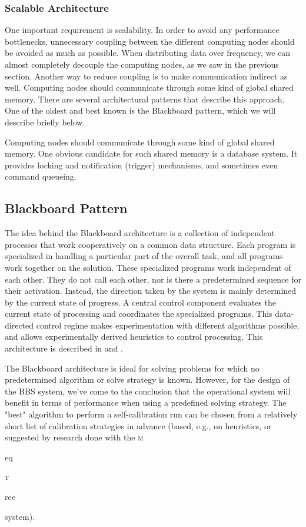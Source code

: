 \documentclass[10pt]{lofar}
\newcommand{\todo}[1]{\begin{center}\fbox{\parbox{0.9\textwidth}{\textbf{!!FIXME!! #1}}}\end{center}}
\newcommand{\meqtree}{\textsc{m}\begin{footnotesize}eq\end{footnotesize}\textsc{t}\begin{footnotesize}ree\end{footnotesize}\xspace}
\begin{document}
\subsubsection{Scalable Architecture}
\label{subsubsec:scalable-architecture}
One important requirement is scalability. In order to avoid any performance
bottlenecks, unnecessary coupling between the different computing nodes should
be avoided as much as possible. When distributing data over frequency, we can
almost completely decouple the computing nodes, as we saw in the previous
section. Another way to reduce coupling is to make communication indirect as
well. Computing nodes should communicate through some kind of global shared
memory. There are several architectural patterns that describe this approach. 
One of the oldest and best known is the Blackboard pattern, which we will 
describe briefly below.

Computing nodes should communicate through some kind of global shared
memory. One obvious candidate for such shared memory is a database system. It
provides locking and notification (trigger) mechanisms, and sometimes even
command queueing.

\todo{see SDD-050 section 4.2 for requirements}

\subsection{Blackboard Pattern}
\label{subsec:blackboard}
The idea behind the Blackboard architecture is a collection of independent
processes that work cooperatively on a common data structure. Each program is
specialized in handling a particular part of the overall task, and all
programs work together on the solution. These specialized programs work
independent of each other. They do not call each other, nor is there a
predetermined sequence for their activation. Instead, the direction taken by
the system is mainly determined by the current state of progress. A central
control component evaluates the current state of processing and coordinates
the specialized programs. This data-directed control regime makes
experimentation with different algorithms possible, and allows experimentally
derived heuristics to control processing. This architecture is described in
\cite{Buschmann1996} and
\cite{LOFAR-ASTRON-SDD-002}.

The Blackboard architecture is ideal for solving problems for which no
predetermined algorithm or solve strategy is known. However, for the design of
the BBS system, we've come to the conclusion that the operational system will
benefit in terms of performance when using a predefined solving strategy. The
"best" algorithm to perform a self-calibration run can be chosen from a
relatively short list of calibration strategies in advance (based, e.g., on
heuristics, or suggested by research done with the \meqtree system).
\end{document}
